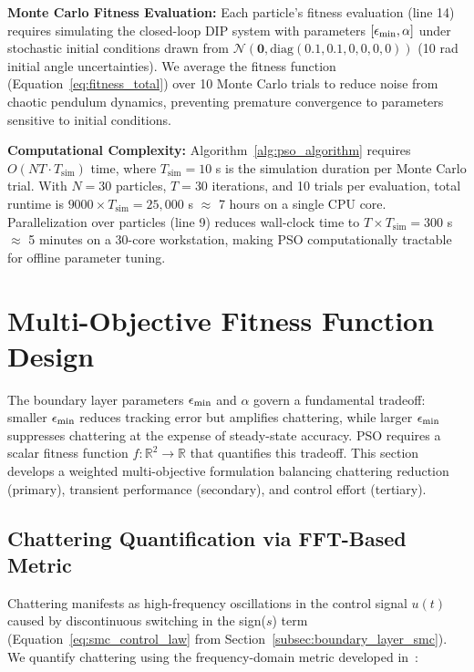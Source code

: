 \textbf{Monte Carlo Fitness Evaluation:} Each particle's fitness evaluation (line 14) requires simulating the closed-loop DIP system with parameters $[\epsilon_{\min}, \alpha]$ under stochastic initial conditions drawn from $\mathcal{N}(\mathbf{0}, \text{diag}(0.1, 0.1, 0, 0, 0, 0))$ (10 rad initial angle uncertainties). We average the fitness function (Equation~\ref{eq:fitness_total}) over 10 Monte Carlo trials to reduce noise from chaotic pendulum dynamics, preventing premature convergence to parameters sensitive to initial conditions.

\textbf{Computational Complexity:} Algorithm~\ref{alg:pso_algorithm} requires $O(NT \cdot T_{\text{sim}})$ time, where $T_{\text{sim}} = 10$ s is the simulation duration per Monte Carlo trial. With $N=30$ particles, $T=30$ iterations, and 10 trials per evaluation, total runtime is $9000 \times T_{\text{sim}} = 25,000$ s $\approx$ 7 hours on a single CPU core. Parallelization over particles (line 9) reduces wall-clock time to $T \times T_{\text{sim}} = 300$ s $\approx$ 5 minutes on a 30-core workstation, making PSO computationally tractable for offline parameter tuning.

\section{Multi-Objective Fitness Function Design}
\label{sec:fitness_function}

The boundary layer parameters $\epsilon_{\min}$ and $\alpha$ govern a fundamental tradeoff: smaller $\epsilon_{\min}$ reduces tracking error but amplifies chattering, while larger $\epsilon_{\min}$ suppresses chattering at the expense of steady-state accuracy. PSO requires a scalar fitness function $f: \mathbb{R}^2 \to \mathbb{R}$ that quantifies this tradeoff. This section develops a weighted multi-objective formulation balancing chattering reduction (primary), transient performance (secondary), and control effort (tertiary).

\subsection{Chattering Quantification via FFT-Based Metric}
\label{subsec:chattering_metric}

Chattering manifests as high-frequency oscillations in the control signal $u(t)$ caused by discontinuous switching in the sign($s$) term (Equation~\ref{eq:smc_control_law} from Section~\ref{subsec:boundary_layer_smc}). We quantify chattering using the frequency-domain metric developed in~\cite{levant2007principles}:

